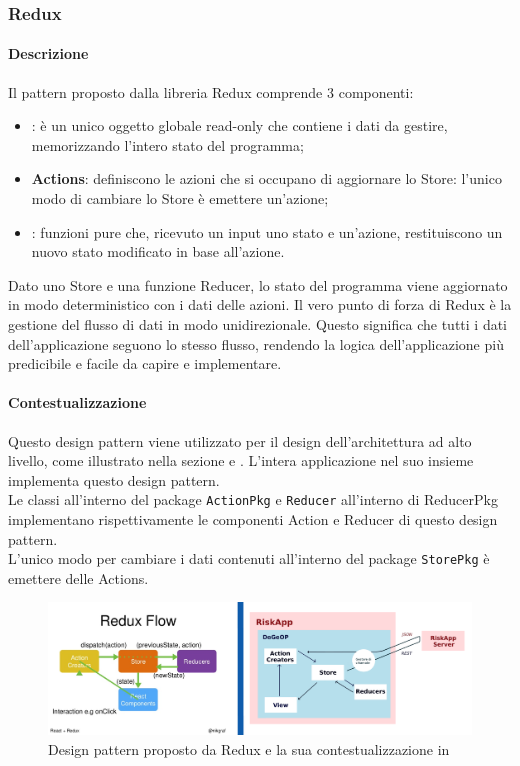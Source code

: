 \subsubsection{Redux}
\label{dp_redux} %
\paragraph{Descrizione}
Il pattern proposto dalla libreria Redux comprende 3 componenti:
\begin{itemize}
	\item \textbf{}: è un unico oggetto globale read-only che contiene i dati da gestire, memorizzando l'intero stato del programma;
	\item \textbf{Actions}: definiscono le azioni che si occupano di aggiornare lo Store: l'unico modo di cambiare lo Store è emettere un'azione;
	\item \textbf{}: funzioni pure che, ricevuto un input uno stato e un'azione, restituiscono un nuovo stato modificato in base all'azione.
\end{itemize}
Dato uno Store e una funzione Reducer, lo stato del programma viene aggiornato in modo deterministico con i dati delle azioni.
Il vero punto di forza di Redux è la gestione del flusso di dati in modo unidirezionale. Questo significa che tutti i dati dell'applicazione seguono lo stesso flusso, rendendo la logica dell'applicazione più predicibile e facile da capire e implementare.
\paragraph{Contestualizzazione}
Questo design pattern viene utilizzato per il design dell'architettura ad alto livello, come illustrato nella sezione  e . L'intera applicazione nel suo insieme implementa questo design pattern.
\\Le classi \texttt{} all'interno del package \texttt{ActionPkg} e \texttt{Reducer} all'interno di ReducerPkg implementano rispettivamente le componenti Action e Reducer di questo design pattern.
\\L'unico modo per cambiare i dati contenuti all'interno del package \texttt{StorePkg} è emettere delle Actions.
	\begin{figure}[H]
		\label{redux_compara}
		\centering
		\includegraphics[scale=0.3]{img/ComparaArch.png}
		\caption{Design pattern proposto da Redux e la sua contestualizzazione in \progetto}
	\end{figure}